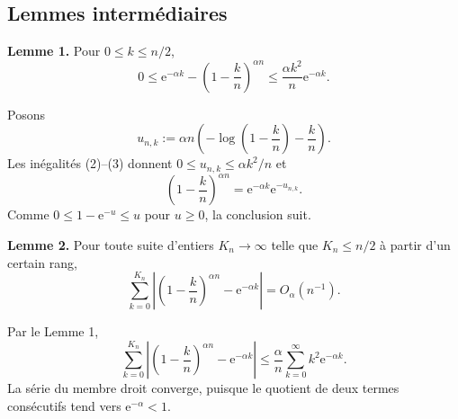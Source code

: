 \documentclass[11pt,a4paper]{article}
\newcommand{\e}{\mathrm e}
\begin{document}
\subsection{Lemmes interm\'ediaires}
\begin{lemmabox}
\textbf{Lemme 1.} Pour $0\leq k\leq n/2$,
\[
 0\leq \e^{-\alpha k}-\left(1-\frac{k}{n}\right)^{\alpha n}
 \leq \frac{\alpha k^2}{n}\e^{-\alpha k}.
\]
\end{lemmabox}
\begin{proofbox}
Posons
\[
 u_{n,k}:=\alpha n\left(-\log\left(1-\frac{k}{n}\right)-\frac{k}{n}\right).
\]
Les in\'egalit\'es (2)--(3) donnent $0\leq u_{n,k}\leq\alpha k^2/n$ et
\[
 \left(1-\frac{k}{n}\right)^{\alpha n}=\e^{-\alpha k}\e^{-u_{n,k}}.
\]
Comme $0\leq1-\e^{-u}\leq u$ pour $u\geq0$, la conclusion suit.
\end{proofbox}

\begin{lemmabox}
\textbf{Lemme 2.} Pour toute suite d'entiers $K_n\to\infty$ telle que
$K_n\leq n/2$ \`a partir d'un certain rang,
\[
 \sum_{k=0}^{K_n}\left|\left(1-\frac{k}{n}\right)^{\alpha n}
 -\e^{-\alpha k}\right|=O_\alpha(n^{-1}).
\]
\end{lemmabox}
\begin{proofbox}
Par le Lemme 1,
\[
 \sum_{k=0}^{K_n}\left|\left(1-\frac{k}{n}\right)^{\alpha n}
 -\e^{-\alpha k}\right|
 \leq\frac{\alpha}{n}\sum_{k=0}^{\infty}k^2\e^{-\alpha k}.
\]
La s\'erie du membre droit converge, puisque le quotient de deux termes
cons\'ecutifs tend vers $\e^{-\alpha}<1$.
\end{proofbox}
\end{document}
